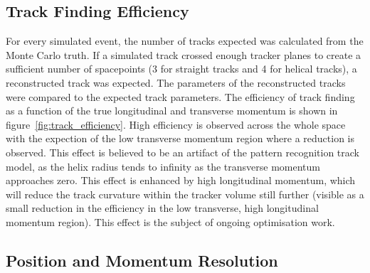   \subsection{Track Finding Efficiency}
  \label{sec:performance:track_finding}

  For every simulated event, the number of tracks expected was calculated from the Monte Carlo truth. If a simulated track crossed enough tracker planes to create a sufficient number of spacepoints (3 for straight tracks and 4 for helical tracks), a reconstructed track was expected. The parameters of the reconstructed tracks were compared to the expected track parameters. The efficiency of track finding as a function of the true longitudinal and transverse momentum is shown in figure~\ref{fig:track_efficiency}. High efficiency is observed across the whole space with the expection of the low transverse momentum region where a reduction is observed. This effect is believed to be an artifact of the pattern recognition track model, as the helix radius tends to infinity as the transverse momentum approaches zero. This effect is enhanced by high longitudinal momentum, which will reduce the track curvature within the tracker volume still further (visible as a small reduction in the efficiency in the low transverse, high longitudinal momentum region). This effect is the subject of ongoing optimisation work.


  \subsection{Position and Momentum Resolution}
  \label{sec:performance:resolutions}
  
  
